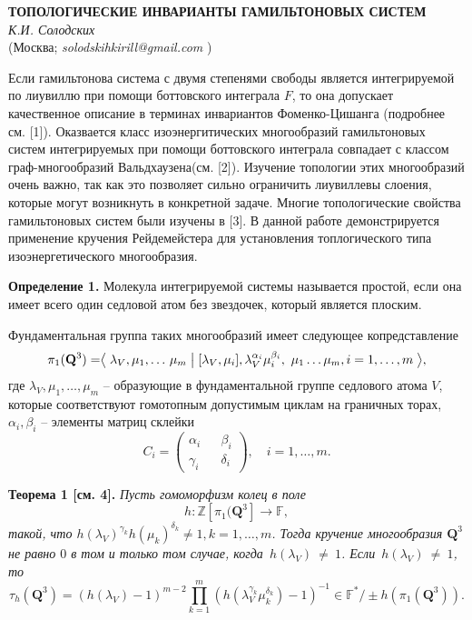\begin{center}{ \bf  ТОПОЛОГИЧЕСКИЕ ИНВАРИАНТЫ ГАМИЛЬТОНОВЫХ СИСТЕМ}\\
{\it К.И. Солодских } \\
(Москва; {\it solodskihkirill@gmail.com} )
\end{center}


Если гамильтонова система с двумя степенями свободы является интегрируемой по лиувиллю при помощи боттовского интеграла $F$, то она допускает качественное описание в терминах инвариантов Фоменко-Цишанга (подробнее см. [1]). Оказвается класс изоэнергитических многообразий гамильтоновых систем интегрируемых при помощи боттовского интеграла совпадает с классом граф-многообразий Вальдхаузена(см. [2]). Изучение топологии этих многообразий очень важно, так как это позволяет сильно ограничить лиувиллевы слоения, которые могут возникнуть в конкретной задаче. Многие топологические свойства гамильтоновых систем были изучены в [3]. В данной работе демонстрируется  применение кручения Рейдемейстера для установления топлогического типа изоэнергетического многообразия.

\textbf{Определение 1.} Молекула интегрируемой системы называется простой, если она имеет всего один седловой атом без звездочек, который является плоским.

Фундаментальная группа таких многообразий имеет следующее копредставление
$$
\pi_1(\mathbf{Q}^3) = \bigm\langle \lambda_V, \mu_1, \dots\, \mu_{m} \bigm|  [\lambda_V, \mu_i], \lambda_V^{\alpha_i}\mu_i^{\beta_i} ,~ \mu_1\dots\mu_m,\\ i = 1,\dots, m \bigm\rangle,
$$
где $\lambda_V, \mu_1, \dots, \mu_m$ -- образующие в фундаментальной группе седлового атома $V$, которые соответствуют гомотопным допустимым циклам на граничных торах, $\alpha_i, \beta_i$ -- элементы матриц склейки
$$
C_i = \begin{pmatrix} \alpha_i && \beta_i \\ \gamma_i && \delta_i \end{pmatrix},\quad i = 1,\dots, m.
$$

\textbf{Теорема 1 [см. 4].} {\it Пусть гомоморфизм колец в поле
$$
h \colon \mathbb{Z}[\pi_1(\mathbf{Q}^3] \rightarrow \mathbb{F},
$$
такой, что $h(\lambda_V)^{\gamma_k}h(\mu_k)^{\delta_k} \ne 1, k = 1,\dots, m$. Тогда кручение многообразия $\mathbf{Q}^3$ не равно $0$ в том и только том случае, когда~$h(\lambda_V)~\ne~1$. Если~$h(\lambda_V)~\ne~1$, то
$$
\tau_h(\mathbf{Q}^3) = (h(\lambda_V) - 1)^{m-2}{\underset{k=1}{\overset{m}{\prod}}(h(\lambda^{\gamma_k}_V\mu^{\delta_k}_k) - 1)^{-1}} \in \mathbb{F}^*/\pm h(\pi_1(\mathbf{Q}^3)).
$$}

